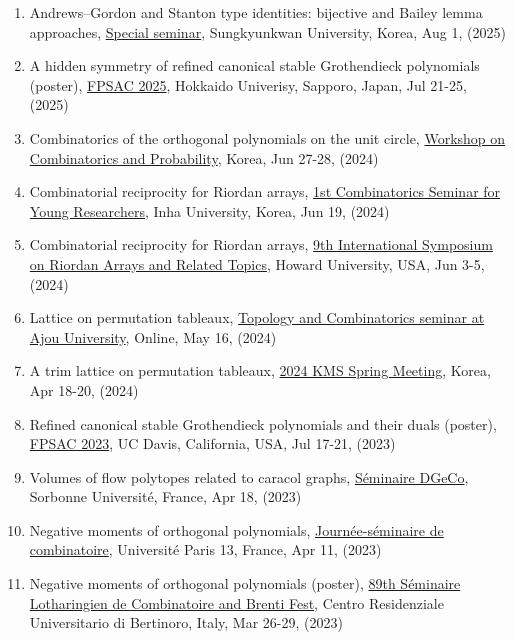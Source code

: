 \documentclass[letterpaper]{article}
\begin{document}
\begin{enumerate}
\item Andrews--Gordon and Stanton type identities: bijective and Bailey lemma approaches, \href{https://math.skku.edu/math/community/seminar.do?mode=view&articleNo=204004&article.offset=0&articleLimit=10}{Special seminar}, Sungkyunkwan University, Korea, Aug 1, (2025)
\item A hidden symmetry of refined canonical stable Grothendieck polynomials (poster), \href{https://www.math.sci.hokudai.ac.jp/sympo/fpsac2025/}{FPSAC 2025}, Hokkaido Univerisy, Sapporo, Japan, Jul 21-25, (2025)
\item Combinatorics of the orthogonal polynomials on the unit circle, \href{http://events.kias.re.kr/h/CombinatoricsProbability/?pageNo=5480}{Workshop on Combinatorics and Probability}, Korea, Jun 27-28, (2024)
\item Combinatorial reciprocity for Riordan arrays, \href{https://sites.google.com/view/csyr/1st?authuser=0}{1st Combinatorics Seminar for Young Researchers}, Inha University, Korea, Jun 19, (2024)
\item Combinatorial reciprocity for Riordan arrays, \href{https://www.riordanarray.org/}{9th International Symposium on Riordan Arrays and Related Topics}, Howard University, USA, Jun 3-5, (2024)
\item Lattice on permutation tableaux, \href{https://sites.google.com/ajou.ac.kr/tcseminar/}{Topology and Combinatorics seminar at Ajou University}, Online, May 16, (2024)
\item A trim lattice on permutation tableaux, \href{https://www.kms.or.kr/conference/2024_spring/}{2024 KMS Spring Meeting}, Korea, Apr 18-20, (2024)
\item Refined canonical stable Grothendieck polynomials and their duals (poster), \href{http://fpsac23.math.ucdavis.edu/}{FPSAC 2023}, UC Davis, California, USA, Jul 17-21, (2023)
\item Volumes of flow polytopes related to caracol graphs, \href{https://dgeco.math.cnrs.fr/}{Séminaire DGeCo}, Sorbonne Université, France, Apr 18, (2023)
\item Negative moments of orthogonal polynomials, \href{https://lipn.fr/~banderier/Seminaires/}{Journée-séminaire de combinatoire}, Université Paris 13, France, Apr 11, (2023)
\item Negative moments of orthogonal polynomials (poster), \href{https://events.unibo.it/combinatorics}{89th Séminaire Lotharingien de Combinatoire and Brenti Fest}, Centro Residenziale Universitario di Bertinoro, Italy, Mar 26-29, (2023)

\end{enumerate}
\end{document}
